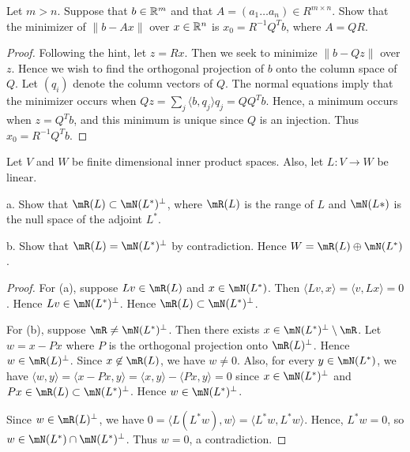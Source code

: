 \documentclass{article}
\begin{document}
 Let $m > n$. Suppose that $b \in \mathbb{R}^m$ and that $A = (a_1 \ldots a_n) \in R^{m \times n}$.  Show that the minimizer of $\|b - Ax\|$ over $x \in \mathbb{R}^n$ is $x_0 = R^{-1}Q^Tb$, where $A = QR$. %

\begin{proof}
Following the hint, let $z = Rx$.  Then we seek to minimize $\|b - Qz\|$ over $z$.  Hence we wish to find the orthogonal projection of $b$ onto the column space of $Q$.  Let $(q_i)$ denote the column vectors of $Q$. The normal equations imply that the minimizer occurs when $Qz = \sum_j \langle b, q_j \rangle q_j = Q Q^T b$.  Hence, a minimum occurs when $z = Q^T b$, and this minimum is unique since $Q$ is an injection.  Thus $x_0 = R^{-1} Q^T b$.
\end{proof}

 Let $V$ and $W$ be finite dimensional inner product spaces. Also, let $L : V \to W$ be linear.

a. Show that $\mR(L) \subset \mN(L^*)^\perp$, where $\mR(L)$ is the range of $L$ and $\mN(L*)$ is the null space of the adjoint $L^*$.

b. Show that $\mR(L) = \mN(L^*)^\perp$ by contradiction. Hence $W = \mR(L) \oplus \mN(L^*)$. %

\begin{proof}
For (a), suppose $Lv \in \mR(L)$ and $x \in \mN(L^*)$.  Then $\langle Lv, x \rangle = \langle v , Lx \rangle = 0$.  Hence $Lv \in \mN(L^*)^\perp$. Hence $\mR(L) \subset \mN(L^*)^\perp$.

For (b), suppose $\mR \neq \mN(L^*)^\perp$. Then there exists $x \in \mN(L^*)^\perp \setminus \mR$.  Let $w = x - Px$ where $P$ is the orthogonal projection onto $\mR(L)^\perp$. Hence $w \in \mR(L)^\perp$. Since $x \not\in \mR(L)$, we have $w \neq 0$.  Also, for every $y \in \mN(L^*)$, we have $\langle w, y \rangle = \langle x - Px , y \rangle = \langle x, y \rangle - \langle Px, y \rangle = 0$ since $x \in \mN(L^*)^\perp$ and $Px \in \mR(L) \subset \mN(L^*)^\perp$.  Hence $w \in \mN(L^*)^\perp$.  

Since $w \in \mR(L)^\perp$, we have $0 = \langle L (L^* w ), w \rangle = \langle L^* w , L^* w \rangle$. Hence, $L^* w = 0$, so $w \in \mN(L^*) \cap \mN(L^*)^\perp$.  Thus $w = 0$, a contradiction.
\end{proof}
\end{document}
